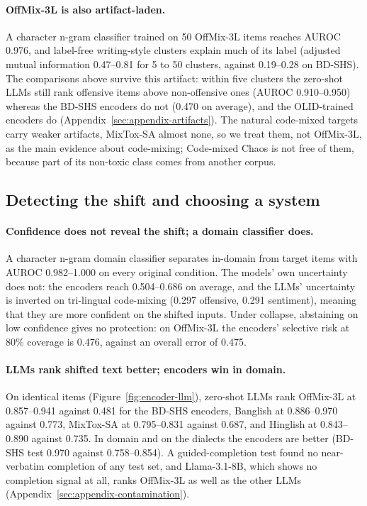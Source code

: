 \paragraph{OffMix-3L is also artifact-laden.}
A character n-gram classifier trained on 50 OffMix-3L items reaches AUROC 0.976, and label-free writing-style clusters
explain much of its label (adjusted mutual information 0.47--0.81 for 5 to 50 clusters, against 0.19--0.28 on BD-SHS).
The comparisons above survive this artifact: within five clusters the zero-shot LLMs still rank offensive items above
non-offensive ones (AUROC 0.910--0.950) whereas the BD-SHS encoders do not (0.470 on average), and the OLID-trained
encoders do (Appendix~\ref{sec:appendix-artifacts}). The natural code-mixed targets carry weaker artifacts, MixTox-SA
almost none, so we treat them, not OffMix-3L, as the main evidence about code-mixing; Code-mixed Chaos is not free of
them, because part of its non-toxic class comes from another corpus.

\subsection{Detecting the shift and choosing a system}
\label{sec:results-systems}

\paragraph{Confidence does not reveal the shift; a domain classifier does.}
A character n-gram domain classifier separates in-domain from target items with AUROC 0.982--1.000 on every original
condition. The models' own uncertainty does not: the encoders reach 0.504--0.686 on average, and the LLMs' uncertainty is
inverted on tri-lingual code-mixing (0.297 offensive, 0.291 sentiment), meaning that they are more confident on the
shifted inputs. Under collapse, abstaining on low confidence gives no protection: on OffMix-3L the encoders' selective
risk at 80\% coverage is 0.476, against an overall error of 0.475.

\paragraph{LLMs rank shifted text better; encoders win in domain.}
On identical items (Figure~\ref{fig:encoder-llm}), zero-shot LLMs rank OffMix-3L at 0.857--0.941 against 0.481 for the
BD-SHS encoders, Banglish at 0.886--0.970 against 0.773, MixTox-SA at 0.795--0.831 against 0.687, and Hinglish at
0.843--0.890 against 0.735. In domain and on the dialects the encoders are better (BD-SHS test 0.970 against
0.758--0.854). A guided-completion test found no near-verbatim completion of any test set, and Llama-3.1-8B, which shows
no completion signal at all, ranks OffMix-3L as well as the other LLMs (Appendix~\ref{sec:appendix-contamination}).

